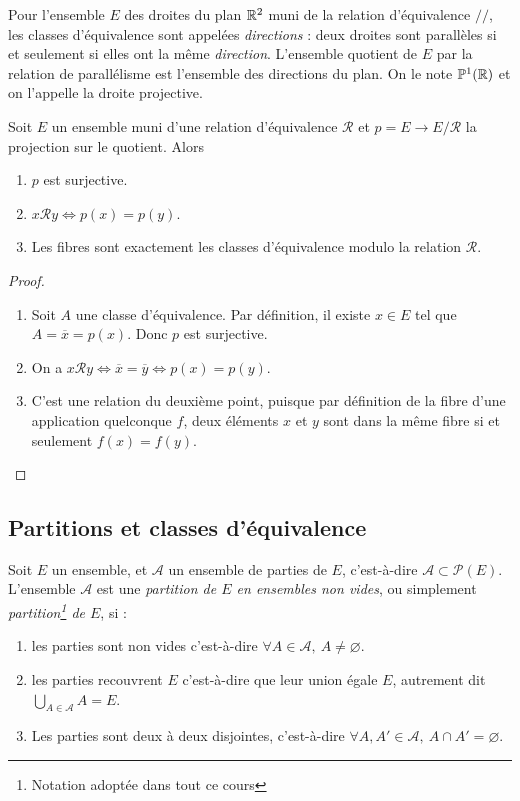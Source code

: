 \begin{exemple}
Pour l'ensemble $E$ des droites du plan $\mathbb{R}^2$ muni de la relation d'équivalence $//$, les classes d'équivalence sont appelées \emph{directions} : deux droites sont parallèles si et seulement si elles ont la même \emph{direction}. L'ensemble quotient de $E$ par la relation de parallélisme est l'ensemble des directions du plan. On le note $\mathbb{P}^1(\mathbb{R})$ et on l'appelle la droite projective.
\end{exemple}

\begin{proposition}
Soit $E$ un ensemble muni d'une relation d'équivalence ${\mathcal R}$ et $p = E\to E/\mathcal R$ la projection sur le quotient. Alors 
\begin{enumerate}
\item $p$ est surjective.
\item $x\mathcal R y \iff p(x)=p(y)$.
\item Les fibres sont exactement les classes d'équivalence modulo la relation $\mathcal R$.
\end{enumerate}
\end{proposition}
\begin{proof}
\begin{enumerate}
\item Soit $A$ une classe d'équivalence. Par définition, il existe $x\in E$ tel que $A = \overline{x} = p(x)$. Donc $p$ est surjective.
\item On a $x\mathcal R y \iff \overline{x} = \overline{y} \iff p(x)=p(y)$.
\item C'est une relation du deuxième point, puisque par définition de la fibre d'une application quelconque $f$, deux éléments $x$ et $y$ sont dans la même fibre si et seulement $f(x)=f(y)$.
\end{enumerate}
\end{proof}




\subsection{Partitions et classes d'équivalence}

\begin{definition}
Soit $E$ un ensemble, et $\mathcal A$ un ensemble de parties de $E$, c'est-à-dire $\mathcal A\subset \mathcal P(E)$. L'ensemble $\mathcal A$ est une \emph{partition de $E$ en ensembles non vides}, ou simplement \emph{partition\footnote{Notation adoptée dans tout ce cours} de $E$}, si : 
\begin{enumerate}
\item les parties sont non vides c'est-à-dire $\forall A\in \mathcal A, \: A\neq \varnothing$.
\item les parties recouvrent $E$ c'est-à-dire que leur union égale $E$, autrement dit $\bigcup_{A\in \mathcal A} A = E$.
\item Les parties sont deux à deux disjointes, c'est-à-dire $\forall A, A' \in \mathcal A, \: A\cap A' = \varnothing$.
\end{enumerate}
\end{definition}

